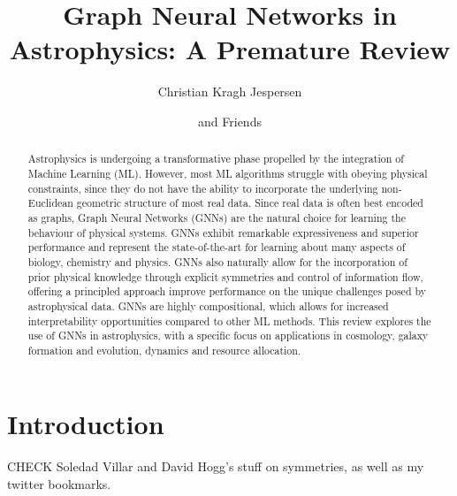 \documentclass[twocolumn,floatfix]{aastex63}
\begin{document}
\title{Graph Neural Networks in Astrophysics: A Premature Review}


\author[0000-0002-8896-6496]{Christian Kragh Jespersen}

\author{and Friends}

\begin{abstract}

Astrophysics is undergoing a transformative phase propelled by the integration of Machine Learning (ML). However, most ML algorithms struggle with obeying physical constraints, since they do not have the ability to incorporate the underlying non-Euclidean geometric structure of most real data. Since real data is often best encoded as graphs, Graph Neural Networks (GNNs) are the natural choice for learning the behaviour of physical systems. GNNs exhibit remarkable expressiveness and superior performance and represent the state-of-the-art for learning about many aspects of biology, chemistry and physics. GNNs also naturally allow for the incorporation of prior physical knowledge through explicit symmetries and control of information flow, offering a principled approach improve performance on the unique challenges posed by astrophysical data. GNNs are highly compositional, which allows for increased interpretability opportunities compared to other ML methods. This review explores the use of GNNs in astrophysics, with a specific focus on applications in cosmology, galaxy formation and evolution, dynamics and resource allocation. 
\end{abstract}

\section{Introduction}
\label{sec:intro}




CHECK Soledad Villar and David Hogg's stuff on symmetries, as well as my twitter bookmarks.
\end{document}
